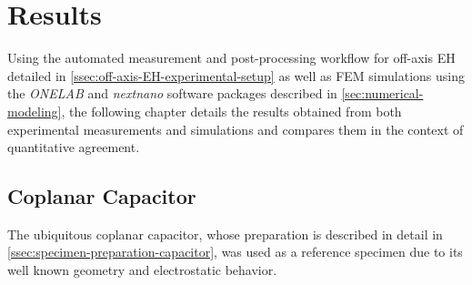 \chapter{Results} \label{chap:experimental-results}
Using the automated measurement and post-processing workflow for off-axis EH detailed in \cref{ssec:off-axis-EH-experimental-setup} as well as FEM simulations using the \emph{ONELAB} and \emph{nextnano} software packages described in \cref{sec:numerical-modeling}, the following chapter details the results obtained from both experimental measurements and simulations and compares them in the context of quantitative agreement.
\section{Coplanar Capacitor} \label{sec:experimental-results-coplanar-capacitor}
The ubiquitous coplanar capacitor, whose preparation is described in detail in \cref{ssec:specimen-preparation-capacitor}, was used as a reference specimen due to its well known geometry and electrostatic behavior.

